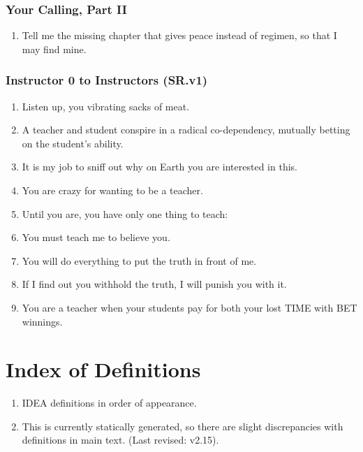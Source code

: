 \documentclass[
]{book}
\providecommand{\tightlist}{%
  \setlength{\itemsep}{0pt}\setlength{\parskip}{0pt}}
\begin{document}
\hypertarget{your-calling-part-ii}{%
\subsection{Your Calling, Part II}\label{your-calling-part-ii}}

\begin{enumerate}
\def\labelenumi{\arabic{enumi}.}
\setcounter{enumi}{3}
\tightlist
\item
  Tell me the missing chapter
  that gives peace instead of regimen,
  so that I may find mine.
\end{enumerate}

\hypertarget{instructor-0-to-instructors-sr.v1}{%
\subsection{Instructor 0 to Instructors (SR.v1)}\label{instructor-0-to-instructors-sr.v1}}

\begin{enumerate}
\def\labelenumi{\arabic{enumi}.}
\setcounter{enumi}{4}
\tightlist
\item
  Listen up, you vibrating sacks of meat.
\item
  A teacher and student conspire in a radical co-dependency, mutually betting on
  the student's ability.
\item
  It is my job to sniff out why on Earth you are interested in this.
\item
  You are crazy for wanting to be a teacher.
\item
  Until you are, you have only one thing to teach:
\item
  You must teach me to believe you.
\item
  You will do everything to put the truth in front of me.
\item
  If I find out you withhold the truth, I will punish you with it.
\item
  You are a teacher when your students pay for both your lost TIME with BET winnings.
\end{enumerate}

\hypertarget{index-of-definitions}{%
\chapter{Index of Definitions}\label{index-of-definitions}}

\begin{enumerate}
\def\labelenumi{\arabic{enumi}.}
\tightlist
\item
  IDEA definitions in order of appearance.
\item
  This is currently statically generated, so there are slight discrepancies with definitions in main text. (Last revised: v2.15).
\end{enumerate}
\end{document}
